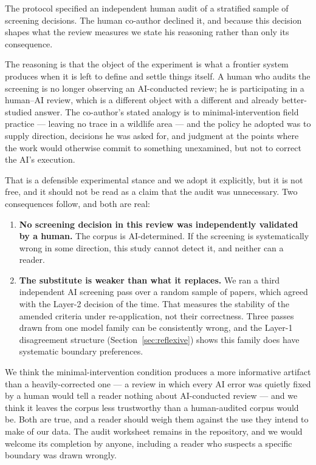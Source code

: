 The protocol specified an independent human audit of a stratified sample of screening
decisions. The human co-author declined it, and because this decision shapes what the review
measures we state his reasoning rather than only its consequence.

The reasoning is that the object of the experiment is what a frontier system produces when it
is left to define and settle things itself. A human who audits the screening is no longer
observing an AI-conducted review; he is participating in a human--AI review, which is a
different object with a different and already better-studied answer. The co-author's stated
analogy is to minimal-intervention field practice --- leaving no trace in a wildlife area ---
and the policy he adopted was to supply direction, decisions he was asked for, and judgment at
the points where the work would otherwise commit to something unexamined, but not to correct
the AI's execution.

That is a defensible experimental stance and we adopt it explicitly, but it is not free, and it
should not be read as a claim that the audit was unnecessary. Two consequences follow, and both
are real:

\begin{enumerate}\itemsep2pt
\item \textbf{No screening decision in this review was independently validated by a human.}
The corpus is AI-determined. If the screening is systematically wrong in some direction, this
study cannot detect it, and neither can a reader.
\item \textbf{The substitute is weaker than what it replaces.} We ran a third independent AI
screening pass over a random sample of \nCons{} papers, which agreed with the Layer-2 decision
\consAgree{} of the time. That measures the stability of the amended criteria under
re-application, not their correctness. Three passes drawn from one model family can be
consistently wrong, and the Layer-1 disagreement structure (Section~\ref{sec:reflexive}) shows
this family does have systematic boundary preferences.
\end{enumerate}

We think the minimal-intervention condition produces a more informative artifact than a
heavily-corrected one --- a review in which every AI error was quietly fixed by a human would
tell a reader nothing about AI-conducted review --- and we think it leaves the corpus less
trustworthy than a human-audited corpus would be. Both are true, and a reader should weigh
them against the use they intend to make of our data. The audit worksheet remains in the
repository, and we would welcome its completion by anyone, including a reader who suspects a
specific boundary was drawn wrongly.
